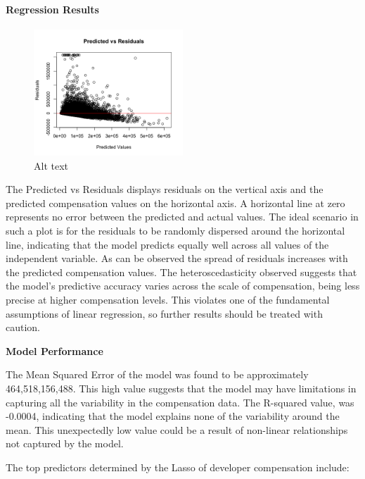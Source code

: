 \documentclass[
  12pt,
]{article}
\begin{document}
\hypertarget{regression-results}{%
\paragraph{Regression Results}\label{regression-results}}

\begin{figure}
\centering
\includegraphics[width=0.5\textwidth,height=0.5\textheight]{predicted_vs_residuals.png}
\caption{Alt text}
\end{figure}

The Predicted vs Residuals displays residuals on the vertical axis and
the predicted compensation values on the horizontal axis. A horizontal
line at zero represents no error between the predicted and actual
values. The ideal scenario in such a plot is for the residuals to be
randomly dispersed around the horizontal line, indicating that the model
predicts equally well across all values of the independent variable. As
can be observed the spread of residuals increases with the predicted
compensation values. The heteroscedasticity observed suggests that the
model's predictive accuracy varies across the scale of compensation,
being less precise at higher compensation levels. This violates one of
the fundamental assumptions of linear regression, so further results
should be treated with caution.

\textbf{Model Performance}

The Mean Squared Error of the model was found to be approximately
464,518,156,488. This high value suggests that the model may have
limitations in capturing all the variability in the compensation data.
The R-squared value, was -0.0004, indicating that the model explains
none of the variability around the mean. This unexpectedly low value
could be a result of non-linear relationships not captured by the model.

The top predictors determined by the Lasso of developer compensation
include:
\end{document}
